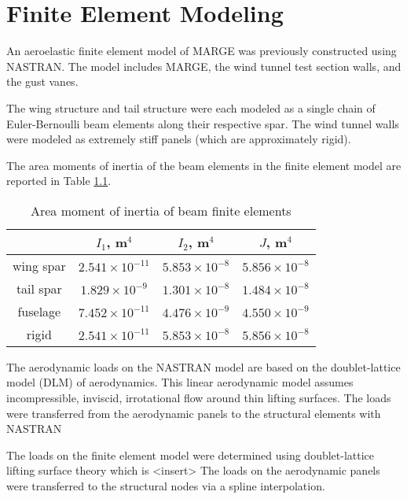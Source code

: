 \chapter{Finite Element Modeling}
\label{ch:nastran}

An aeroelastic finite element model of MARGE was previously constructed using NASTRAN. The model includes MARGE, the wind tunnel test section walls, and the gust vanes.


The wing structure and tail structure were each modeled as a single chain of Euler-Bernoulli beam elements along their respective spar. The wind tunnel walls were modeled as extremely stiff panels (which are approximately rigid).

The area moments of inertia of the beam elements in the finite element model are reported in Table \ref{tab:beamInertia}.
\begin{table}[H]
    \centering
    \caption{Area moment of inertia of beam finite elements}
    \begin{tabular}{cccc}
        \hline\hline
                  & $I_1$, m$^4$          & $I_2$, m$^4$         & $J$, m$^4$           \\
        \hline
        wing spar & $2.541\times10^{-11}$ & $5.853\times10^{-8}$ & $5.856\times10^{-8}$ \\
        tail spar & $1.829\times10^{-9}$  & $1.301\times10^{-8}$ & $1.484\times10^{-8}$ \\
        fuselage  & $7.452\times10^{-11}$ & $4.476\times10^{-9}$ & $4.550\times10^{-9}$ \\
        rigid     & $2.541\times10^{-11}$ & $5.853\times10^{-8}$ & $5.856\times10^{-8}$ \\
        \hline\hline
    \end{tabular}
    \label{tab:beamInertia}
\end{table}

The aerodynamic loads on the NASTRAN model are based on the doublet-lattice model (DLM) of aerodynamics. This linear aerodynamic model assumes incompressible, inviscid, irrotational flow around thin lifting surfaces. The loads were transferred from the aerodynamic panels to the structural elements with NASTRAN

The loads on the finite element model were determined using doublet-lattice lifting surface theory which is <insert>
The loads on the aerodynamic panels were transferred to the structural nodes via a spline interpolation.

